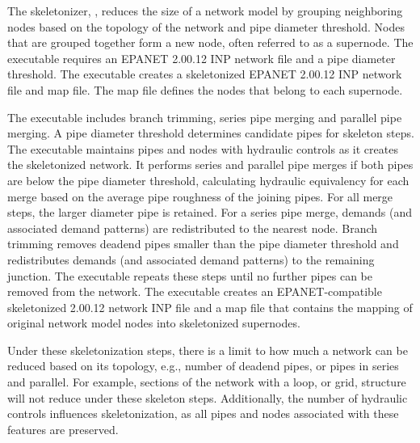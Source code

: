 The skeletonizer, , reduces the size of a network model by 
grouping neighboring nodes based on the topology of the network and pipe diameter 
threshold. Nodes that are grouped together form a new node, often referred to as a supernode.
The  executable requires an EPANET 2.00.12 INP network file and a pipe 
diameter threshold. The executable creates a skeletonized EPANET 2.00.12 INP 
network file and map file. The map file defines the nodes that belong to each supernode.

The  executable includes branch trimming, series pipe merging and 
parallel pipe merging. A pipe diameter threshold determines candidate pipes for 
skeleton steps. The  executable maintains pipes and nodes with 
hydraulic controls as it creates the skeletonized network. It performs 
series and parallel pipe merges if both pipes are below the pipe diameter 
threshold, calculating hydraulic equivalency for each merge based on the average 
pipe roughness of the joining pipes. For all merge steps, the larger diameter 
pipe is retained. For a series pipe merge, demands (and associated demand 
patterns) are redistributed to the nearest node. Branch trimming removes 
deadend pipes smaller than the pipe diameter threshold and redistributes demands 
(and associated demand patterns) to the remaining junction. The  
executable repeats these steps until no further pipes can be removed from the network. 
The  executable creates an EPANET-compatible skeletonized 2.00.12 network INP file 
and a map file that contains the mapping of original network model nodes into 
skeletonized supernodes. 

Under these skeletonization steps, there is a limit to how much a 
network can be reduced based on its topology, e.g., number of deadend pipes, or 
pipes in series and parallel. For example, sections of the network with a loop, 
or grid, structure will not reduce under these skeleton steps. Additionally, 
the number of hydraulic controls influences skeletonization, as all pipes and 
nodes associated with these features are preserved.

